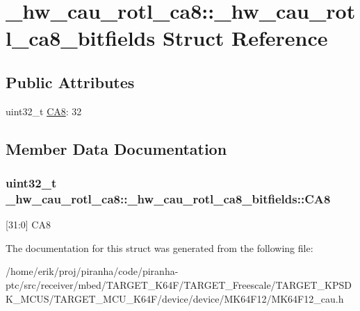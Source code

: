 \hypertarget{struct__hw__cau__rotl__ca8_1_1__hw__cau__rotl__ca8__bitfields}{}\section{\+\_\+hw\+\_\+cau\+\_\+rotl\+\_\+ca8\+:\+:\+\_\+hw\+\_\+cau\+\_\+rotl\+\_\+ca8\+\_\+bitfields Struct Reference}
\label{struct__hw__cau__rotl__ca8_1_1__hw__cau__rotl__ca8__bitfields}
\subsection*{Public Attributes}
\begin{DoxyCompactItemize}
\item 
uint32\+\_\+t \hyperlink{struct__hw__cau__rotl__ca8_1_1__hw__cau__rotl__ca8__bitfields_a13f545ca8fba554a4b3e09332dbe3368}{C\+A8}\+: 32
\end{DoxyCompactItemize}


\subsection{Member Data Documentation}
\subsubsection[{\texorpdfstring{C\+A8}{CA8}}]{\setlength{\rightskip}{0pt plus 5cm}uint32\+\_\+t \+\_\+hw\+\_\+cau\+\_\+rotl\+\_\+ca8\+::\+\_\+hw\+\_\+cau\+\_\+rotl\+\_\+ca8\+\_\+bitfields\+::\+C\+A8}\hypertarget{struct__hw__cau__rotl__ca8_1_1__hw__cau__rotl__ca8__bitfields_a13f545ca8fba554a4b3e09332dbe3368}{}\label{struct__hw__cau__rotl__ca8_1_1__hw__cau__rotl__ca8__bitfields_a13f545ca8fba554a4b3e09332dbe3368}
\mbox{[}31\+:0\mbox{]} C\+A8 

The documentation for this struct was generated from the following file\+:\begin{DoxyCompactItemize}
\item 
/home/erik/proj/piranha/code/piranha-\/ptc/src/receiver/mbed/\+T\+A\+R\+G\+E\+T\+\_\+\+K64\+F/\+T\+A\+R\+G\+E\+T\+\_\+\+Freescale/\+T\+A\+R\+G\+E\+T\+\_\+\+K\+P\+S\+D\+K\+\_\+\+M\+C\+U\+S/\+T\+A\+R\+G\+E\+T\+\_\+\+M\+C\+U\+\_\+\+K64\+F/device/device/\+M\+K64\+F12/M\+K64\+F12\+\_\+cau.\+h\end{DoxyCompactItemize}
